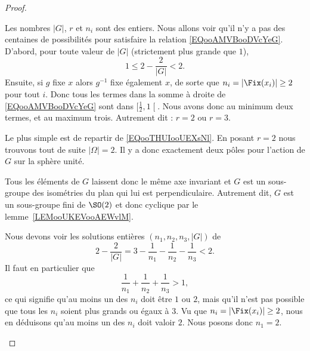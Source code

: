 \begin{proof}
\begin{subproof}
            Les nombres \( | G |\), \( r\) et \( n_i\) sont des entiers. Nous allons voir qu'il n'y a pas des centaines de possibilités pour satisfaire la relation \eqref{EQooAMVBooDVcYeG}. D'abord, pour toute valeur de \( | G |\) (strictement plus grande que \( 1\)),
            \begin{equation}
                1\leq 2-\frac{ 2 }{ | G | }<2.
            \end{equation}
            Ensuite, si \( g\) fixe \( x\) alors \( g^{-1}\) fixe également \( x\), de sorte que \( n_i=| \Fix(x_i) |\geq 2\) pour tout \( i\). Donc tous les termes dans la somme à droite de \eqref{EQooAMVBooDVcYeG} sont dans \( \mathopen[ \frac{ 1 }{2} , 1 \mathclose[\). Nous avons donc au minimum deux termes, et au maximum trois. Autrement dit : \( r=2\) ou \( r=3\).

            \item[Si \( r=2\)]

                Le plus simple est de repartir de \eqref{EQooTHUIooUEXsNl}. En posant \( r=2\) nous trouvons tout de suite \( | \Omega |=2\). Il y a donc exactement deux pôles pour l'action de \( G\) sur la sphère unité.

                Tous les éléments de \( G\) laissent donc le même axe invariant et \( G\) est un sous-groupe des isométries du plan qui lui est perpendiculaire. Autrement dit, \( G\) est un sous-groupe fini de \( \SO(2)\) et donc cyclique par le lemme~\ref{LEMooUKEVooAEWvlM}.

            \item[Les possibilités pour \( r=3\)]

                Nous devons voir les solutions entières \( (n_1,n_2,n_3,| G |)\) de
                \begin{equation}
                    2-\frac{ 2 }{ | G | }=3-\frac{1}{ n_1 }-\frac{1}{ n_2 }-\frac{1}{ n_3 }<2.
                \end{equation}
                Il faut en particulier que
                \begin{equation}
                    \frac{1}{ n_1 }+\frac{1}{ n_2 }+\frac{1}{ n_3 }>1,
                \end{equation}
                ce qui signifie qu'au moins un des \( n_i\) doit être \( 1\) ou \( 2\), mais qu'il n'est pas possible que tous les \( n_i\) soient plus grands ou égaux à \( 3\). Vu que \( n_i=| \Fix(x_i) |\geq 2\), nous en déduisons qu'au moins un des \( n_i\) doit valoir \( 2\). Nous posons donc \( n_1=2\).


\end{subproof}
\end{proof}
